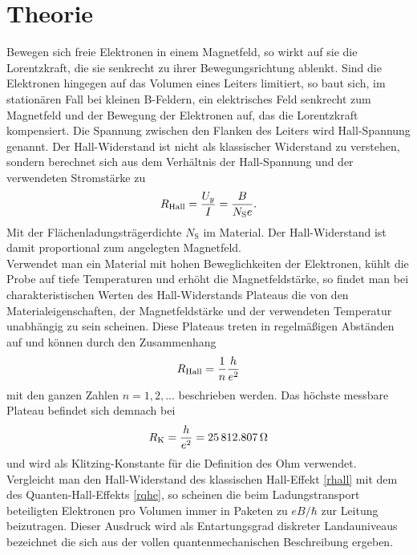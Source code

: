 \documentclass[paper=a4,fontsize=10pt,DIV=18,twocolumn,parskip=half]{scrartcl}
\numberwithin{equation}{section}    %
\begin{document}
%
\section{Theorie}
\label{Theorie}
\label{theorie}
Bewegen sich freie Elektronen in einem Magnetfeld, so wirkt auf sie die Lorentzkraft, die sie senkrecht zu ihrer Bewegungsrichtung ablenkt. Sind die Elektronen hingegen auf das Volumen eines Leiters limitiert, so baut sich, im stationären Fall bei kleinen B-Feldern, ein elektrisches Feld senkrecht zum Magnetfeld und der Bewegung der Elektronen auf, das die Lorentzkraft kompensiert. Die Spannung zwischen den Flanken des Leiters wird Hall-Spannung genannt. Der Hall-Widerstand ist nicht als klassischer Widerstand zu verstehen, sondern berechnet sich aus dem Verhältnis der Hall-Spannung und der verwendeten Stromstärke zu
\begin{equation}
R_{\rm Hall}=\frac{U_y}{I}=\frac{B}{N_\mathrm{S} e}.
\label{rhall}
\end{equation}
Mit der Flächenladungsträgerdichte $N_\mathrm{S}$ im Material. Der Hall-Widerstand ist damit proportional zum angelegten Magnetfeld. \\
Verwendet man ein Material mit hohen Beweglichkeiten der Elektronen, kühlt die Probe auf tiefe Temperaturen und erhöht die Magnetfeldstärke, so findet man bei charakteristischen Werten des Hall-Widerstands Plateaus die von den Materialeigenschaften, der Magnetfeldstärke und der verwendeten Temperatur unabhängig zu sein scheinen.
Diese Plateaus treten in regelmäßigen Abständen auf und können durch den Zusammenhang 
\begin{equation}
R_{\rm Hall}=\frac{1}{n} \frac{h}{e^2} 
\label{rqhe}
\end{equation}
mit den ganzen Zahlen $n=1,2,...$ beschrieben werden.  Das höchste messbare Plateau befindet sich demnach bei 
\begin{equation}
R_{\rm K}=\frac{h}{e^2}= \SI{25812.807}{\ohm}
\end{equation}
und wird als Klitzing-Konstante für die Definition des Ohm verwendet.\\
Vergleicht man den Hall-Widerstand des klassischen Hall-Effekt \ref{rhall} mit dem des Quanten-Hall-Effekts \ref{rqhe}, so scheinen die beim Ladungstransport beteiligten Elektronen pro Volumen immer in Paketen zu $e B/\hbar$ zur Leitung beizutragen. Dieser Ausdruck wird als Entartungsgrad diskreter Landauniveaus bezeichnet die sich aus der vollen quantenmechanischen Beschreibung ergeben.
\end{document}
